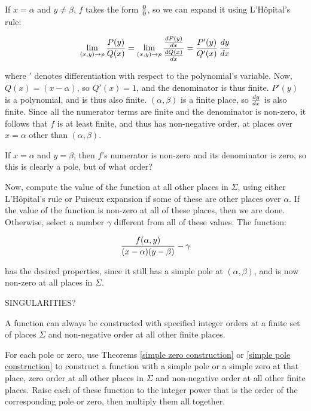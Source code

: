 If $x=\alpha$ and $y\ne\beta$, $f$ takes the form $0\over0$, so we can
expand it using L'H\^opital's rule:

$$\lim_{(x,y)\to p} {{P(y)}\over{Q(x)}}
  = \lim_{{(x,y)\to p}} {{{dP(y)}\over{dx}}\over{{dQ(x)}\over{dx}}}
  = {{P'(y)}\over{Q'(x)}} \, {{dy}\over{dx}} $$

where $'$ denotes differentiation with respect to the polynomial's
variable.  Now, $Q(x)=(x-\alpha)$, so $Q'(x)=1$, and the denominator
is thus finite.  $P'(y)$ is a polynomial, and is thus also finite.
$(\alpha, \beta)$ is a finite place, so ${dy}\over{dx}$ is also
finite.  Since all the numerator terms are finite and the denominator
is non-zero, it follows that $f$ is at least finite, and thus has
non-negative order, at places over $x=\alpha$ other than $(\alpha,
\beta)$.

If $x=\alpha$ and $y=\beta$, then $f$'s numerator is non-zero and its
denominator is zero, so this is clearly a pole, but of what order?

Now, compute the value of the function at all other places in
$\Sigma$, using either L'H\^opital's rule or Puiseux expansion if some
of these are other places over $\alpha$.  If the value of the function
is non-zero at all of these places, then we are done.  Otherwise,
select a number $\gamma$ different from all of these values.  The
function:

$${f(\alpha,y)\over(x-\alpha)(y-\beta)} - \gamma$$

has the desired properties, since it still has a simple pole at
$(\alpha,\beta)$, and is now non-zero at all places in $\Sigma$.

SINGULARITIES?

\endtheorem

\theorem
\label{finite orders construction}

A function can always be constructed with specified integer orders at
a finite set of places $\Sigma$ and non-negative order at all other finite
places.

\proof

For each pole or zero, use Theorems \ref{simple zero construction} or
\ref{simple pole construction} to construct a function with a simple
pole or a simple zero at that place, zero order at all other places in
$\Sigma$ and non-negative order at all other finite places.  Raise
each of these function to the integer power that is the order of the
corresponding pole or zero, then multiply them all together.

\endtheorem

